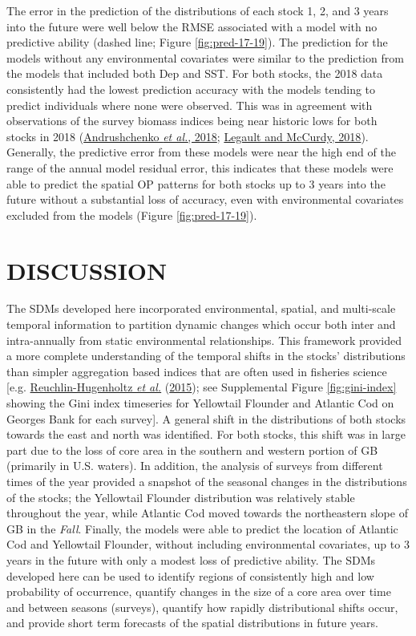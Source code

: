 \documentclass[
]{article}
\begin{document}
The error in the prediction of the distributions of each stock 1, 2, and 3 years into the future were well below the RMSE associated with a model with no predictive ability (dashed line; Figure \ref{fig:pred-17-19}). The prediction for the models without any environmental covariates were similar to the prediction from the models that included both Dep and SST. For both stocks, the 2018 data consistently had the lowest prediction accuracy with the models tending to predict individuals where none were observed. This was in agreement with observations of the survey biomass indices being near historic lows for both stocks in 2018 (\protect\hyperlink{ref-andrushchenkoAssessmentEasternGeorges2018}{Andrushchenko \emph{et al.}, 2018}; \protect\hyperlink{ref-legaultStockAssessmentGeorges2018}{Legault and McCurdy, 2018}). Generally, the predictive error from these models were near the high end of the range of the annual model residual error, this indicates that these models were able to predict the spatial OP patterns for both stocks up to 3 years into the future without a substantial loss of accuracy, even with environmental covariates excluded from the models (Figure \ref{fig:pred-17-19}).

\hypertarget{discussion}{%
\section{DISCUSSION}\label{discussion}}

The SDMs developed here incorporated environmental, spatial, and multi-scale temporal information to partition dynamic changes which occur both inter and intra-annually from static environmental relationships. This framework provided a more complete understanding of the temporal shifts in the stocks' distributions than simpler aggregation based indices that are often used in fisheries science {[}e.g. \protect\hyperlink{ref-reuchlin-hugenholtzPotentialSpatialDistribution2015}{Reuchlin-Hugenholtz \emph{et al.}} (\protect\hyperlink{ref-reuchlin-hugenholtzPotentialSpatialDistribution2015}{2015}); see Supplemental Figure \ref{fig:gini-index} showing the Gini index timeseries for Yellowtail Flounder and Atlantic Cod on Georges Bank for each survey{]}. A general shift in the distributions of both stocks towards the east and north was identified. For both stocks, this shift was in large part due to the loss of core area in the southern and western portion of GB (primarily in U.S. waters). In addition, the analysis of surveys from different times of the year provided a snapshot of the seasonal changes in the distributions of the stocks; the Yellowtail Flounder distribution was relatively stable throughout the year, while Atlantic Cod moved towards the northeastern slope of GB in the \emph{Fall}. Finally, the models were able to predict the location of Atlantic Cod and Yellowtail Flounder, without including environmental covariates, up to 3 years in the future with only a modest loss of predictive ability. The SDMs developed here can be used to identify regions of consistently high and low probability of occurrence, quantify changes in the size of a core area over time and between seasons (surveys), quantify how rapidly distributional shifts occur, and provide short term forecasts of the spatial distributions in future years.
\end{document}
